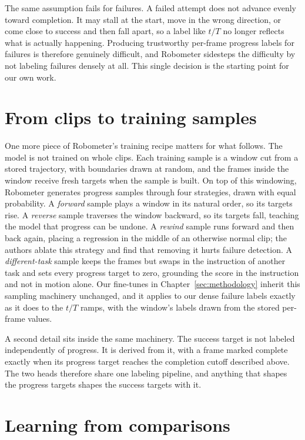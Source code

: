 The same assumption fails for failures. A failed attempt does not advance evenly toward completion. It may stall at the start, move in the wrong direction, or come close to success and then fall apart, so a label like $t/T$ no longer reflects what is actually happening. Producing trustworthy per-frame progress labels for failures is therefore genuinely difficult, and Robometer sidesteps the difficulty by not labeling failures densely at all. This single decision is the starting point for our own work.

\section{From clips to training samples}
\label{sec:bg-sampling}

One more piece of Robometer's training recipe matters for what follows. The model is not trained on whole clips. Each training sample is a window cut from a stored trajectory, with boundaries drawn at random, and the frames inside the window receive fresh targets when the sample is built. On top of this windowing, Robometer generates progress samples through four strategies, drawn with equal probability. A \emph{forward} sample plays a window in its natural order, so its targets rise. A \emph{reverse} sample traverses the window backward, so its targets fall, teaching the model that progress can be undone. A \emph{rewind} sample runs forward and then back again, placing a regression in the middle of an otherwise normal clip; the authors ablate this strategy and find that removing it hurts failure detection. A \emph{different-task} sample keeps the frames but swaps in the instruction of another task and sets every progress target to zero, grounding the score in the instruction and not in motion alone. Our fine-tunes in Chapter~\ref{sec:methodology} inherit this sampling machinery unchanged, and it applies to our dense failure labels exactly as it does to the $t/T$ ramps, with the window's labels drawn from the stored per-frame values.

A second detail sits inside the same machinery. The success target is not labeled independently of progress. It is derived from it, with a frame marked complete exactly when its progress target reaches the completion cutoff described above. The two heads therefore share one labeling pipeline, and anything that shapes the progress targets shapes the success targets with it.

\section{Learning from comparisons}
\label{sec:bg-comparisons}

